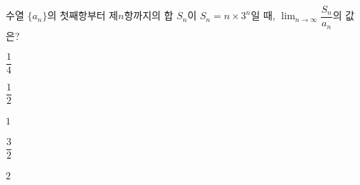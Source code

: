 수열 $\{a_n\}$의 첫째항부터 제$n$항까지의 합 $S_n$이 $S_n=n\times 3^n$일 때, $\displaystyle\lim_{n\to\infty}\dfrac{S_n}{a_n}$의 값은?
\begin{choices32}{\rule[-3ex]{0pt}{8ex}$\dfrac{1}{4}$}{\rule[-3ex]{0pt}{8ex}$\dfrac{1}{2}$}{\rule[-3ex]{0pt}{8ex}$1$}{\rule[-3ex]{0pt}{8ex}$\dfrac{3}{2}$}{\rule[-3ex]{0pt}{8ex}$2$}\end{choices32}
